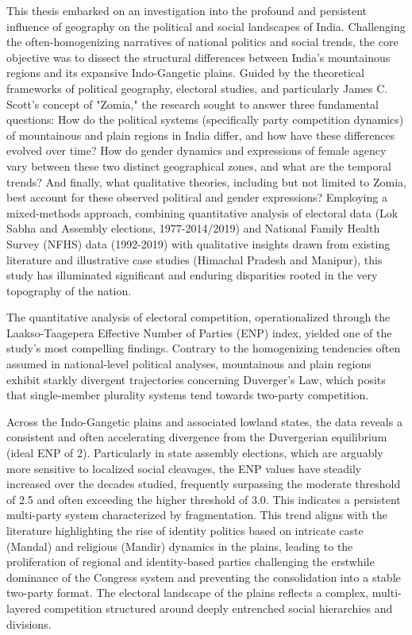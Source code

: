 

This thesis embarked on an investigation into the profound and persistent influence of geography on the political and social landscapes of India. Challenging the often-homogenizing narratives of national politics and social trends, the core objective was to dissect the structural differences between India's mountainous regions and its expansive Indo-Gangetic plains. Guided by the theoretical frameworks of political geography, electoral studies, and particularly James C. Scott's concept of "Zomia," the research sought to answer three fundamental questions: How do the political systems (specifically party competition dynamics) of mountainous and plain regions in India differ, and how have these differences evolved over time? How do gender dynamics and expressions of female agency vary between these two distinct geographical zones, and what are the temporal trends? And finally, what qualitative theories, including but not limited to Zomia, best account for these observed political and gender expressions? Employing a mixed-methods approach, combining quantitative analysis of electoral data (Lok Sabha and Assembly elections, 1977-2014/2019) and National Family Health Survey (NFHS) data (1992-2019) with qualitative insights drawn from existing literature and illustrative case studies (Himachal Pradesh and Manipur), this study has illuminated significant and enduring disparities rooted in the very topography of the nation.


The quantitative analysis of electoral competition, operationalized through the Laakso-Taagepera Effective Number of Parties (ENP) index, yielded one of the study's most compelling findings. Contrary to the homogenizing tendencies often assumed in national-level political analyses, mountainous and plain regions exhibit starkly divergent trajectories concerning Duverger's Law, which posits that single-member plurality systems tend towards two-party competition.

Across the Indo-Gangetic plains and associated lowland states, the data reveals a consistent and often accelerating divergence from the Duvergerian equilibrium (ideal ENP of 2). Particularly in state assembly elections, which are arguably more sensitive to localized social cleavages, the ENP values have steadily increased over the decades studied, frequently surpassing the moderate threshold of 2.5 and often exceeding the higher threshold of 3.0. This indicates a persistent multi-party system characterized by fragmentation. This trend aligns with the literature highlighting the rise of identity politics based on intricate caste (Mandal) and religious (Mandir) dynamics in the plains, leading to the proliferation of regional and identity-based parties challenging the erstwhile dominance of the Congress system and preventing the consolidation into a stable two-party format. The electoral landscape of the plains reflects a complex, multi-layered competition structured around deeply entrenched social hierarchies and divisions.

